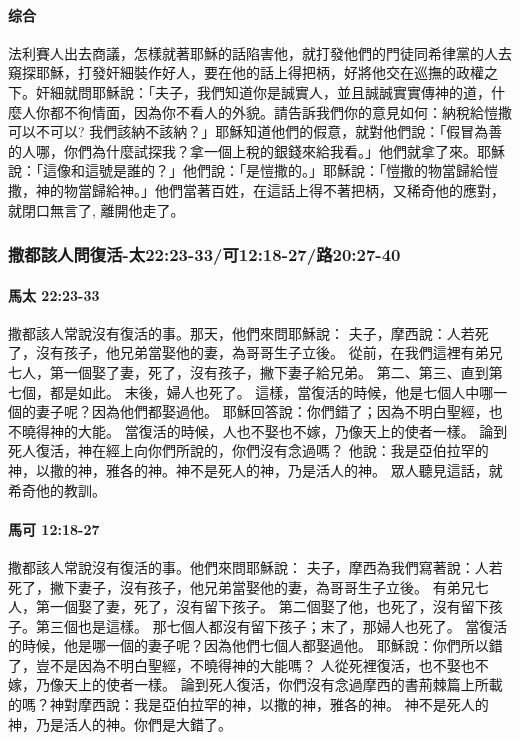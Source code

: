 \paragraph{综合}
法利賽人出去商議，怎樣就著耶穌的話陷害他，就打發他們的門徒同希律黨的人去窺探耶穌，打發奸細裝作好人，要在他的話上得把柄，好將他交在巡撫的政權之下。奸細就問耶穌說：「夫子，我們知道你是誠實人，並且誠誠實實傳神的道，什麼人你都不徇情面，因為你不看人的外貌。請告訴我們你的意見如何：納稅給愷撒可以不可以? 我們該納不該納？」耶穌知道他們的假意，就對他們說：「假冒為善的人哪，你們為什麼試探我？拿一個上稅的銀錢來給我看。」他們就拿了來。耶穌說：「這像和這號是誰的？」他們說：「是愷撒的。」耶穌說：「愷撒的物當歸給愷撒，神的物當歸給神。」他們當著百姓，在這話上得不著把柄，又稀奇他的應對，就閉口無言了, 離開他走了。


\subsubsection{撒都該人問復活-太22:23-33/可12:18-27/路20:27-40}
\paragraph{馬太 22:23-33}
撒都該人常說沒有復活的事。那天，他們來問耶穌說：
夫子，摩西說：人若死了，沒有孩子，他兄弟當娶他的妻，為哥哥生子立後。
從前，在我們這裡有弟兄七人，第一個娶了妻，死了，沒有孩子，撇下妻子給兄弟。
第二、第三、直到第七個，都是如此。
末後，婦人也死了。
這樣，當復活的時候，他是七個人中哪一個的妻子呢？因為他們都娶過他。
耶穌回答說：你們錯了；因為不明白聖經，也不曉得神的大能。
當復活的時候，人也不娶也不嫁，乃像天上的使者一樣。
論到死人復活，神在經上向你們所說的，你們沒有念過嗎？
他說：我是亞伯拉罕的神，以撒的神，雅各的神。神不是死人的神，乃是活人的神。
眾人聽見這話，就希奇他的教訓。
\paragraph{馬可 12:18-27}
撒都該人常說沒有復活的事。他們來問耶穌說：
夫子，摩西為我們寫著說：人若死了，撇下妻子，沒有孩子，他兄弟當娶他的妻，為哥哥生子立後。
有弟兄七人，第一個娶了妻，死了，沒有留下孩子。
第二個娶了他，也死了，沒有留下孩子。第三個也是這樣。
那七個人都沒有留下孩子；末了，那婦人也死了。
當復活的時候，他是哪一個的妻子呢？因為他們七個人都娶過他。
耶穌說：你們所以錯了，豈不是因為不明白聖經，不曉得神的大能嗎？
人從死裡復活，也不娶也不嫁，乃像天上的使者一樣。
論到死人復活，你們沒有念過摩西的書荊棘篇上所載的嗎？神對摩西說：我是亞伯拉罕的神，以撒的神，雅各的神。
神不是死人的神，乃是活人的神。你們是大錯了。
